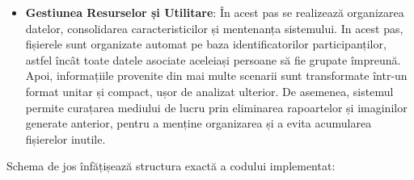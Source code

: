 \documentclass[12pt,a4paper]{report}
\theoremstyle{definition}
\theoremstyle{remark}
\begin{document}
\begin{itemize}
    \item \textbf{Gestiunea Resurselor și Utilitare}: În acest pas se realizează organizarea datelor, consolidarea caracteristicilor și mentenanța sistemului. In acest pas, fișierele sunt organizate automat pe baza identificatorilor participanților, astfel încât toate datele asociate aceleiași persoane să fie grupate împreună. Apoi, informațiile provenite din mai multe scenarii sunt transformate într-un format unitar și compact, ușor de analizat ulterior. De asemenea, sistemul permite curațarea mediului de lucru prin eliminarea rapoartelor și imaginilor generate anterior, pentru a menține organizarea și a evita acumularea fișierelor inutile.
\end{itemize}

Schema de jos înfățișează structura exactă a codului implementat:\\
\newline


\end{document}
